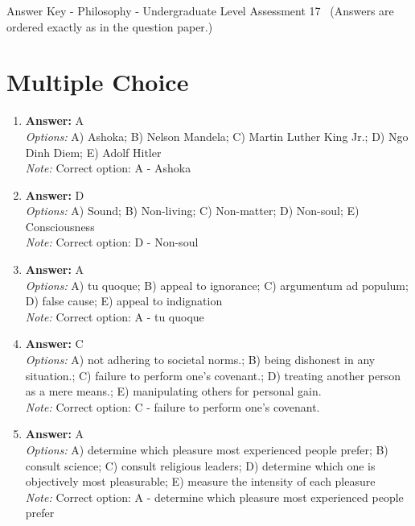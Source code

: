 \documentclass[12pt]{article}
\begin{document}
\begin{center}
Answer Key - Philosophy - Undergraduate Level Assessment 17 \
\small (Answers are ordered exactly as in the question paper.)
\end{center}

\section*{Multiple Choice}
\begin{enumerate}[label=\arabic*.]
\item \textbf{Answer:} A
\\ \textit{Options:} A) Ashoka; B) Nelson Mandela; C) Martin Luther King Jr.; D) Ngo Dinh Diem; E) Adolf Hitler
\\ \textit{Note:} Correct option: A - Ashoka
\item \textbf{Answer:} D
\\ \textit{Options:} A) Sound; B) Non-living; C) Non-matter; D) Non-soul; E) Consciousness
\\ \textit{Note:} Correct option: D - Non-soul
\item \textbf{Answer:} A
\\ \textit{Options:} A) tu quoque; B) appeal to ignorance; C) argumentum ad populum; D) false cause; E) appeal to indignation
\\ \textit{Note:} Correct option: A - tu quoque
\item \textbf{Answer:} C
\\ \textit{Options:} A) not adhering to societal norms.; B) being dishonest in any situation.; C) failure to perform one's covenant.; D) treating another person as a mere means.; E) manipulating others for personal gain.
\\ \textit{Note:} Correct option: C - failure to perform one's covenant.
\item \textbf{Answer:} A
\\ \textit{Options:} A) determine which pleasure most experienced people prefer; B) consult science; C) consult religious leaders; D) determine which one is objectively most pleasurable; E) measure the intensity of each pleasure
\\ \textit{Note:} Correct option: A - determine which pleasure most experienced people prefer
\end{enumerate}
\end{document}
